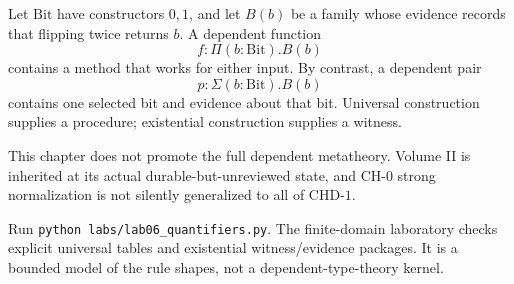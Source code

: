 

\begin{workedexample}[title={Finite universal construction}]
Let $\mathrm{Bit}$ have constructors $0,1$, and let $B(b)$ be a family whose evidence records that flipping twice returns $b$. A dependent function
\[
f:\Pi(b:\mathrm{Bit}).B(b)
\]
contains a method that works for either input. By contrast, a dependent pair
\[
p:\Sigma(b:\mathrm{Bit}).B(b)
\]
contains one selected bit and evidence about that bit. Universal construction supplies a procedure; existential construction supplies a witness.
\end{workedexample}



\begin{warningbox}
This chapter does not promote the full dependent metatheory. Volume II is inherited at its actual durable-but-unreviewed state, and $\mathrm{CH}\text{-}0$ strong normalization is not silently generalized to all of $\mathrm{CHD}\text{-}1$.
\end{warningbox}

\begin{labbox}
Run \texttt{python labs/lab06_quantifiers.py}. The finite-domain laboratory checks explicit universal tables and existential witness/evidence packages. It is a bounded model of the rule shapes, not a dependent-type-theory kernel.
\end{labbox}

